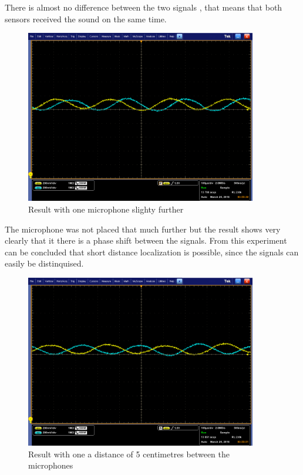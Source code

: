 \documentclass[10pt,a4paper]{article}
\begin{document}
There is almost no difference between the two signals , that means that both sensors received the sound on the same time. 

\begin{figure}[H]
\centering
\includegraphics[width=0.9\textwidth]{experiment2.png}
\caption{Result with one microphone slighty further} 
\label{experiment2}
\end{figure}

The microphone was not placed that much further but the result shows very clearly that it there is a phase shift between the signals.
From this experiment can be concluded that short distance localization is possible, since the signals can easily be distinquised. 
\begin{figure}[H]
\centering
\includegraphics[width=0.9\textwidth]{experiment3.png}
\caption{Result with one a distance of 5 centimetres between the microphones} 
\label{experiment3}
\end{figure}
\end{document}
